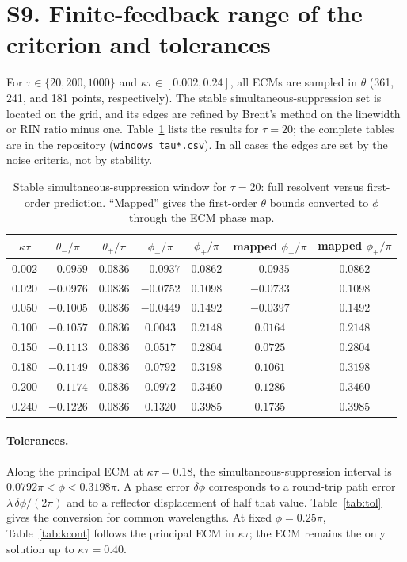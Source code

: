 \documentclass[11pt]{article}
\newif\ifmarked
\newenvironment{revised}{\ifmarked\color{blue}\fi}{}
\begin{document}
\begin{revised}
\section*{S9. Finite-feedback range of the criterion and tolerances}

For $\tau\in\{20,200,1000\}$ and $\kappa\tau\in[0.002,0.24]$, all ECMs are sampled in $\theta$ (361, 241, and 181 points, respectively). The stable simultaneous-suppression set is located on the grid, and its edges are refined by Brent's method on the linewidth or RIN ratio minus one. Table~\ref{tab:windows} lists the results for $\tau=20$; the complete tables are in the repository (\texttt{windows\_tau*.csv}). In all cases the edges are set by the noise criteria, not by stability.

\begin{table}[h]
\centering
\caption{Stable simultaneous-suppression window for $\tau=20$: full resolvent versus first-order prediction. ``Mapped'' gives the first-order $\theta$ bounds converted to $\phi$ through the ECM phase map.}
\label{tab:windows}
\begin{tabular}{ccccccc}
\toprule
$\kappa\tau$ & $\theta_-/\pi$ & $\theta_+/\pi$ & $\phi_-/\pi$ & $\phi_+/\pi$ & mapped $\phi_-/\pi$ & mapped $\phi_+/\pi$\\
\midrule
0.002 & $-0.0959$ & $0.0836$ & $-0.0937$ & $0.0862$ & $-0.0935$ & $0.0862$\\
0.020 & $-0.0976$ & $0.0836$ & $-0.0752$ & $0.1098$ & $-0.0733$ & $0.1098$\\
0.050 & $-0.1005$ & $0.0836$ & $-0.0449$ & $0.1492$ & $-0.0397$ & $0.1492$\\
0.100 & $-0.1057$ & $0.0836$ & $0.0043$ & $0.2148$ & $0.0164$ & $0.2148$\\
0.150 & $-0.1113$ & $0.0836$ & $0.0517$ & $0.2804$ & $0.0725$ & $0.2804$\\
0.180 & $-0.1149$ & $0.0836$ & $0.0792$ & $0.3198$ & $0.1061$ & $0.3198$\\
0.200 & $-0.1174$ & $0.0836$ & $0.0972$ & $0.3460$ & $0.1286$ & $0.3460$\\
0.240 & $-0.1226$ & $0.0836$ & $0.1320$ & $0.3985$ & $0.1735$ & $0.3985$\\
\bottomrule
\end{tabular}
\end{table}

\paragraph{Tolerances.} Along the principal ECM at $\kappa\tau=0.18$, the simultaneous-suppression interval is $0.0792\pi<\phi<0.3198\pi$. A phase error $\delta\phi$ corresponds to a round-trip path error $\lambda\,\delta\phi/(2\pi)$ and to a reflector displacement of half that value. Table~\ref{tab:tol} gives the conversion for common wavelengths. At fixed $\phi=0.25\pi$, Table~\ref{tab:kcont} follows the principal ECM in $\kappa\tau$; the ECM remains the only solution up to $\kappa\tau=0.40$.


\end{revised}
\end{document}
